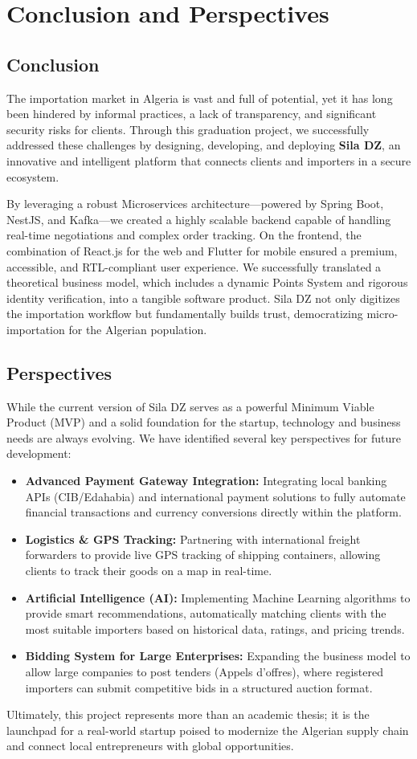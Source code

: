 \chapter{Conclusion and Perspectives}

\section{Conclusion}
The importation market in Algeria is vast and full of potential, yet it has long been hindered by informal practices, a lack of transparency, and significant security risks for clients. Through this graduation project, we successfully addressed these challenges by designing, developing, and deploying \textbf{Sila DZ}, an innovative and intelligent platform that connects clients and importers in a secure ecosystem.

By leveraging a robust Microservices architecture—powered by Spring Boot, NestJS, and Kafka—we created a highly scalable backend capable of handling real-time negotiations and complex order tracking. On the frontend, the combination of React.js for the web and Flutter for mobile ensured a premium, accessible, and RTL-compliant user experience. We successfully translated a theoretical business model, which includes a dynamic Points System and rigorous identity verification, into a tangible software product. Sila DZ not only digitizes the importation workflow but fundamentally builds trust, democratizing micro-importation for the Algerian population.

\section{Perspectives}
While the current version of Sila DZ serves as a powerful Minimum Viable Product (MVP) and a solid foundation for the startup, technology and business needs are always evolving. We have identified several key perspectives for future development:
\begin{itemize}
    \item \textbf{Advanced Payment Gateway Integration:} Integrating local banking APIs (CIB/Edahabia) and international payment solutions to fully automate financial transactions and currency conversions directly within the platform.
    \item \textbf{Logistics \& GPS Tracking:} Partnering with international freight forwarders to provide live GPS tracking of shipping containers, allowing clients to track their goods on a map in real-time.
    \item \textbf{Artificial Intelligence (AI):} Implementing Machine Learning algorithms to provide smart recommendations, automatically matching clients with the most suitable importers based on historical data, ratings, and pricing trends.
    \item \textbf{Bidding System for Large Enterprises:} Expanding the business model to allow large companies to post tenders (Appels d'offres), where registered importers can submit competitive bids in a structured auction format.
\end{itemize}

Ultimately, this project represents more than an academic thesis; it is the launchpad for a real-world startup poised to modernize the Algerian supply chain and connect local entrepreneurs with global opportunities.
